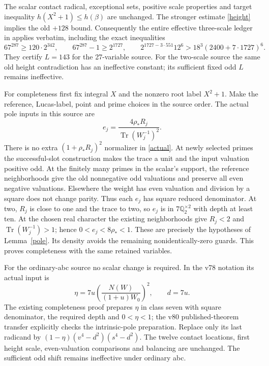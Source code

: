 \documentclass[11pt]{article}
\newcommand{\Q}{\mathbb Q}\newcommand{\Z}{\mathbb Z}
\newcommand{\Tr}{\operatorname{Tr}}\newcommand{\sqf}{\operatorname{sqf}}
\begin{document}
The scalar contact radical, exceptional sets, positive scale properties
and target inequality $h(X^2+1)\le h(\beta)$ are unchanged.
The stronger estimate \eqref{height} implies the old $+128$ bound.
Consequently the entire effective three-scale ledger in
\cite[Sections 4--5]{scalar} applies verbatim, including the exact
inequalities
\[
 67^{287}\ge120\cdot2^{342},\qquad
 67^{287}-1\ge2^{1727},\qquad
 2^{1727-3\cdot551}12^6>18^3(2400+7\cdot1727)^6.
\]
They certify $L=143$ for the 27-variable source. For the two-scale source
the same old height contradiction has an ineffective constant; its
sufficient fixed odd $L$ remains ineffective.

For completeness first fix integral $X$ and the nonzero root label
$X^2+1$. Make the reference, Lucas-label, point and prime choices in
the source order. The actual pole inputs in this source are
\begin{equation}\label{actual}
 e_j=\frac{4\rho_*R_j}{\Tr(W_j^{-1})^2}.
\end{equation}
There is no extra $(1+\rho_*R_j)^2$ normalizer in \eqref{actual}.
At newly selected primes the successful-slot construction makes the trace
a unit and the input valuation positive odd. At the finitely many primes
in the scalar's support, the reference neighborhoods give the old
nonnegative odd valuations and preserve all even negative valuations.
Elsewhere the weight has even valuation and division by a square does
not change parity. Thus each $e_j$ has square reduced denominator.
At two, $R_j$ is close to one and the trace to two, so $e_j$ is in
$7\Q_2^{\times2}$ with depth at least ten. At the chosen real character
the existing neighborhoods give $R_j<2$ and $\Tr(W_j^{-1})>1$;
hence $0<e_j<8\rho_*<1$. These are precisely the hypotheses of
Lemma~\ref{pole}. Its density avoids the remaining nonidentically-zero
guards. This proves completeness with the same retained variables.

For the ordinary-abc source no scalar change is required. In the v78
notation its actual input is
\[
 \eta=7u\left(\frac{N(W)}{(1+u)W_0}\right)^2,
 \qquad d=7u.
\]
The existing completeness proof prepares $\eta$ in class seven with
square denominator, the required depth and $0<\eta<1$; the v80
published-theorem transfer explicitly checks the intrinsic-pole
preparation. Replace only its last radicand by
$(1-\eta)(v^4-d^2)(s^4-d^2)$. The twelve contact locations, first
height scale, even-valuation comparisons and balancing are unchanged.
The sufficient odd shift remains ineffective under ordinary abc.
\end{document}
